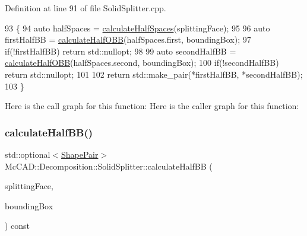 Definition at line 91 of file Solid\+Splitter.\+cpp.


\begin{DoxyCode}
93                                               \{
94     \textcolor{keyword}{auto} halfSpaces = \hyperlink{classMcCAD_1_1Decomposition_1_1SolidSplitter_a30fbfd5f3829a840d6cbe4d50f71fa00}{calculateHalfSpaces}(splittingFace);
95 
96     \textcolor{keyword}{auto} firstHalfBB = \hyperlink{classMcCAD_1_1Decomposition_1_1SolidSplitter_aed5d786662443c45343c480b00c6f6e8}{calculateHalfOBB}(halfSpaces.first, boundingBox);
97     \textcolor{keywordflow}{if}(!firstHalfBB) \textcolor{keywordflow}{return} std::nullopt;
98 
99     \textcolor{keyword}{auto} secondHalfBB = \hyperlink{classMcCAD_1_1Decomposition_1_1SolidSplitter_aed5d786662443c45343c480b00c6f6e8}{calculateHalfOBB}(halfSpaces.second, boundingBox);
100     \textcolor{keywordflow}{if}(!secondHalfBB) \textcolor{keywordflow}{return} std::nullopt;
101 
102     \textcolor{keywordflow}{return} std::make\_pair(*firstHalfBB, *secondHalfBB);
103 \}
\end{DoxyCode}
Here is the call graph for this function\+:
Here is the caller graph for this function\+:
\mbox{\label{classMcCAD_1_1Decomposition_1_1SolidSplitter_af799d68c9e95e188e15b435713a11d31}} 
\subsubsection{\texorpdfstring{calculate\+Half\+B\+B()}{calculateHalfBB()}\hspace{0.1cm}{\footnotesize\ttfamily [2/2]}}
{\footnotesize\ttfamily std\+::optional$<$\hyperlink{classMcCAD_1_1Decomposition_1_1SolidSplitter_a6d92618f3790cfc7403c6f421bd66411}{Shape\+Pair}$>$ Mc\+C\+A\+D\+::\+Decomposition\+::\+Solid\+Splitter\+::calculate\+Half\+BB (\begin{DoxyParamCaption}\item[{const Topo\+D\+S\+\_\+\+Face \&}]{splitting\+Face,  }\item[{const Topo\+D\+S\+\_\+\+Shape \&}]{bounding\+Box }\end{DoxyParamCaption}) const\hspace{0.3cm}{\ttfamily [private]}}

